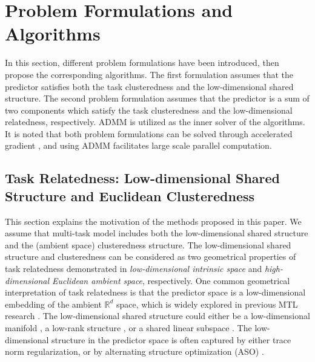 \documentclass[twoside,leqno,twocolumn]{article}
\begin{document}
\section{Problem Formulations and Algorithms}

In this section, different problem formulations have been introduced, then propose the corresponding algorithms. The
first formulation assumes that the predictor satisfies both the task clusteredness
and the low-dimensional shared structure. The second problem formulation
assumes that the predictor is a sum of two components which satisfy
the task clusteredness and the low-dimensional relatedness, respectively.
ADMM is utilized as the inner solver of the algorithms.
It is noted that both problem formulations
can  be solved through accelerated gradient \cite{ji2009accelerated},
and using ADMM facilitates large scale parallel computation.


\subsection{Task Relatedness: Low-dimensional Shared Structure and Euclidean
Clusteredness}


This section explains the motivation of the methods proposed
in this paper. We assume that multi-task model includes
both the low-dimensional shared structure and the (ambient space) clusteredness
structure. The low-dimensional shared structure and clusteredness
can be considered as two geometrical properties of task relatedness
demonstrated in \emph{low-dimensional  intrinsic space}
and \emph{high-dimensional Euclidean ambient space}, respectively.
One common geometrical interpretation of task relatedness is that
the predictor space is a low-dimensional embedding of the ambient
$\mathbb{R}^{d}$ space, which is widely explored in previous MTL
research \cite{cmtl:nips2011:zhou2011clustered,mtl:aso:ando2005framework}.
The low-dimensional shared structure could either be a low-dimensional
manifold \cite{mtl:nips2010:manifold:agarwal2010learning}, a low-rank
structure \cite{ji2009accelerated}, or a shared linear subspace \cite{mtl:aso:ando2005framework}.
The low-dimensional structure in the predictor space is often captured
by either trace norm regularization, or by alternating structure optimization
(ASO) \cite{mtl:aso:ando2005framework}. 
\end{document}
